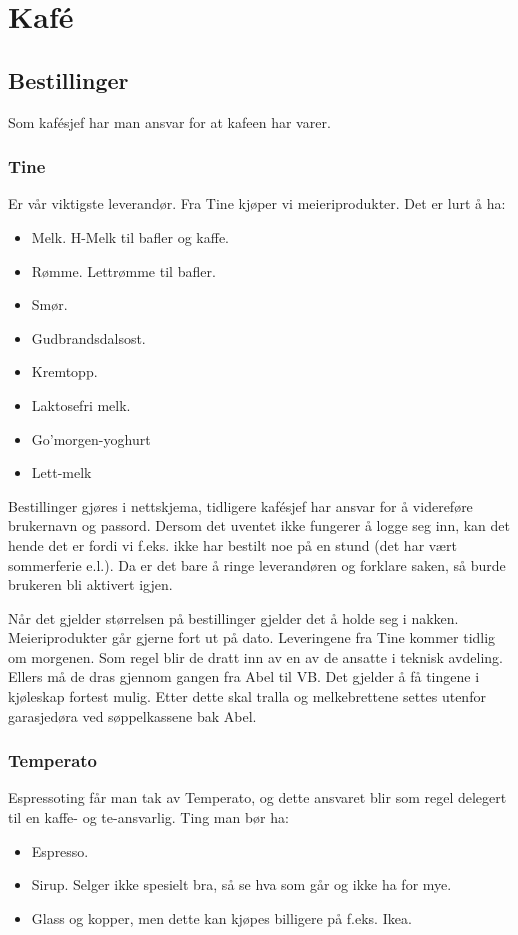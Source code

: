 \section{Kaf\'e}

\subsection{Bestillinger}
Som kaf\'esjef har man ansvar for at kafeen har varer.
\subsubsection{Tine}
Er vår viktigste leverandør. Fra Tine kjøper vi meieriprodukter.
Det er lurt å ha:
\begin{itemize}
    \item Melk. H-Melk til bafler og kaffe.
    \item Rømme. Lettrømme til bafler.
    \item Smør.
    \item Gudbrandsdalsost.
    \item Kremtopp.
    \item Laktosefri melk.
    \item Go'morgen-yoghurt
    \item Lett-melk
\end{itemize}

Bestillinger gjøres i nettskjema, tidligere kafésjef har ansvar for å videreføre
brukernavn og passord. Dersom det uventet ikke fungerer å logge seg inn, kan det
hende det er fordi vi f.eks. ikke har bestilt noe på en stund (det har vært
sommerferie e.l.). Da er det bare å ringe leverandøren og forklare saken, så
burde brukeren bli aktivert igjen.

Når det gjelder størrelsen på bestillinger gjelder det å holde seg i nakken.
Meieriprodukter går gjerne fort ut på dato. Leveringene fra Tine kommer tidlig
om morgenen. Som regel blir de dratt inn av en av de ansatte i teknisk avdeling.
Ellers må de dras gjennom gangen fra Abel til VB. Det gjelder å få tingene i
kjøleskap fortest mulig. Etter dette skal tralla og melkebrettene settes utenfor
garasjedøra ved søppelkassene bak Abel.

\subsubsection{Temperato}
Espressoting får man tak av Temperato, og dette ansvaret blir som regel delegert
til en kaffe- og te-ansvarlig. Ting man bør ha:
\begin{itemize}
    \item Espresso.
    \item Sirup. Selger ikke spesielt bra, så se hva som går og ikke ha for mye.
    \item Glass og kopper, men dette kan kjøpes billigere på f.eks. Ikea.
\end{itemize}

